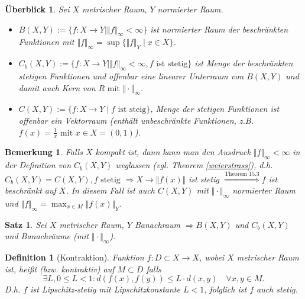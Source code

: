 \documentclass[ngerman,a4paper]{report}
\theoremstyle{break}
\newtheorem{satz}[theorem]{Satz}
\newtheorem{overview}[theorem]{Überblick}
\newtheorem*{definition}{Definition}
\newtheorem{remark}[theorem]{Bemerkung}
\begin{document}
\begin{overview}
    Sei $X$ metrischer Raum, $Y$ normierter Raum.
    \begin{itemize}
    \item $B(X,Y):=\{f:X\to Y\mid \Vert f\Vert_{\infty} < \infty\}$ ist normierter Raum der beschränkten Funktionen mit $\Vert f\Vert_{\infty}=\sup\{\Vert f \Vert_{Y} \mid x \in X\}$.
    \item $C_b(X,Y):=\{f:X\to Y\mid \Vert f \Vert_{\infty} < \infty, f \text{ ist stetig}\}$ ist Menge der beschränkten stetigen Funktionen und offenbar eine linearer Unterraum von $B(X,Y)$ und damit auch Kern von $R \text{ mit } \Vert \cdot \Vert_{\infty}$.
    \item $C(X,Y):= \{f: X\to Y\mid f \text{ ist steig}\}$, Menge der stetigen Funktionen ist offenbar ein Vektorraum (enthält unbeschränkte Funktionen, z.B. $f(x)=\frac{1}{x} \text{ mit } x \in X = (0,1)$).
    \end{itemize}
\end{overview}

\begin{remark}
	Falls $X$ kompakt ist, dann kann man den Ausdruck $\Vert f \Vert_{\infty} < \infty$ in der Definition von $C_b(X,Y)$ weglassen (vgl. Theorem \ref{weierstrass}), d.h. $C_b(X,Y) = C(X,Y),f \text{ stetig }\Rightarrow X \to \Vert f(x)\Vert$ ist stetig $\overset{\text{Theorem 15.3}}{\Rightarrow} f$ ist beschränkt auf $X$. In diesem Fall ist auch $C(X,Y)$ mit $\Vert \cdot \Vert_{\infty}$ normierter Raum und $\Vert f\Vert_{\infty} = \max_{x\in M}\Vert f(x)\Vert_{Y}$.
\end{remark}

\begin{satz}
    Sei $X$ metrischer Raum, $Y$ Banachraum $\Rightarrow B(X,Y)$ und $C_b(X,Y)$ und Banachräume (mit $\Vert \cdot \Vert_{\infty}$).
\end{satz}

\begin{definition}[Kontraktion]
    Funktion $f: D \subset X \to X$, wobei $X$ metrischer Raum ist, heißt  (bzw. kontraktiv) auf $M \subset D$ falls
    \[
    \exists L, 0 \leq L < 1\colon d(f(x),f(y)) \leq L\cdot d(x,y) \quad \forall x,y \in M.
    \]
    D.h. $f$ ist Lipschitz-stetig mit Lipschitzkonstante $L < 1$, folglich ist $f$ auch stetig.
\end{definition}
\end{document}
